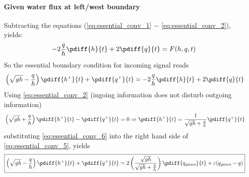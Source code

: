 \paragraph*{Given water flux at left/west boundary}
Subtracting the equations (\eqref{eq:essential_conv_1} $-$ \eqref{eq:essential_conv_2}), yields:
\begin{align}
    - 2 \frac{q}{h}\pdiff{h}{t}  + 2 \pdiff{q}{t} & =  F(h, q, t)
\end{align}
So the essential boundary condition for incoming signal reads
\begin{align}
    & \left(\sqrt{gh} - \frac{q}{h}\right) \pdiff{h^{+}}{t} + \pdiff{q^{+}}{t} =
    - 2 \frac{q}{h}\pdiff{h}{t}  + 2 \pdiff{q}{t} \label{eq:essential_conv_5}
\end{align}
Using \autoref{eq:essential_conv_2} (ingoing information does not disturb outgoing information)
\begin{align}
    &\left(\sqrt{gh} + \frac{q}{h}\right) \pdiff{h^{+}}{t} - \pdiff{q^{+}}{t} = 0
    \Rightarrow
    \pdiff{h^{+}}{t}   =
    \frac{1}{\sqrt{gh} + \frac{q}{h}}\pdiff{q^{+}}{t}\label{eq:essential_conv_6}
\end{align}
substituting \autoref{eq:essential_conv_6} into the right hand side of \autoref{eq:essential_conv_5}, yields
\begin{align}
    &{\boxed{
            \left(\sqrt{gh} - \frac{q}{h}\right) \pdiff{h^{+}}{t} + \pdiff{q^{+}}{t} =
            2 \left( \frac{\sqrt{gh}}{\sqrt{gh} + \frac{q}{h}} \right)\pdiff{q_{\textit{given}}}{t} + \eps(q_{\textit{given}} - q)
    }}\label{eq:essential_bc_q_1d}
\end{align}
